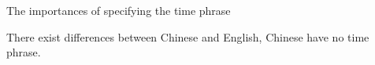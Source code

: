 \begin{notation}
    The importances of specifying the time phrase

    There exist differences between Chinese and English, Chinese have no time phrase.
\end{notation}

